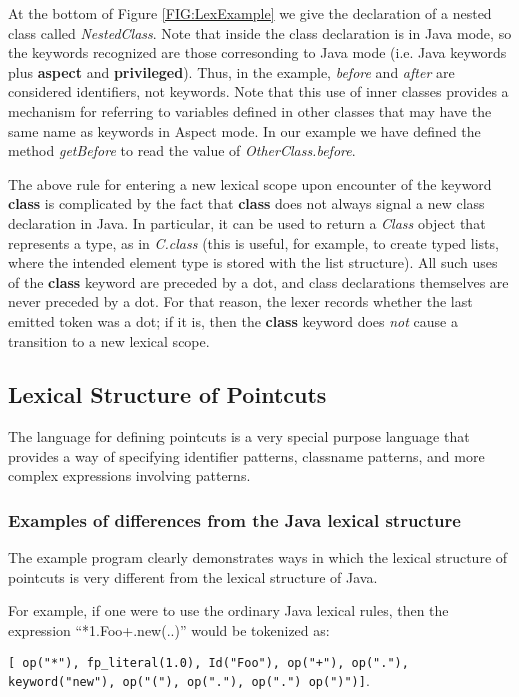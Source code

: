 At the bottom of Figure \ref{FIG:LexExample} we give the declaration of
a nested class called {\em NestedClass}.   Note that inside the class
declaration is in {\sc Java} mode,  so the keywords recognized are those
corresonding to {\sc Java} mode (i.e. Java keywords plus {\bf aspect}
and {\bf privileged}).    Thus, in the example,  
{\em before} and {\em after} are considered identifiers, not keywords.   
Note that this use of
inner classes provides a mechanism for referring to variables defined
in other classes that may have the same name as keywords in 
{\sc Aspect} mode.  In our example we have defined the method
{\em getBefore} to read the value of {\em OtherClass.before}.

The above rule for entering a new lexical scope upon encounter of
the keyword {\bf class} is complicated by the fact that {\bf class}
does not always signal a new class declaration in Java. In particular,
it can be used to return a {\em Class} object that represents a type,
as in {\em C.class} (this is useful, for example, to create typed lists, 
where the intended element type is stored with the list structure).
All such uses of the {\bf class} keyword are preceded by a
dot, and class declarations themselves are never preceded by a dot. 
For that reason, the lexer records whether the last emitted token
was a dot; if it is, then the {\bf class} keyword does {\em not}
cause a transition to a new lexical scope.

\subsection{Lexical Structure of Pointcuts}

The language for defining pointcuts is a very special purpose
language that provides a way of specifying identifier patterns,
classname patterns, and more complex expressions involving
patterns.     

\subsubsection{Examples of differences from the Java lexical structure}
The example program clearly demonstrates ways in which the
lexical structure of pointcuts is very different from the 
lexical structure of Java.

For example, if one were to use the ordinary Java
lexical rules, then the expression ``*1.Foo+.new(..)'' 
would be tokenized as:

{\tt[ op("*"), fp\_literal(1.0), Id("Foo"), op("+"), op("."),  
keyword("new"), op("("), op("."), op(".") op(")")]}.  

